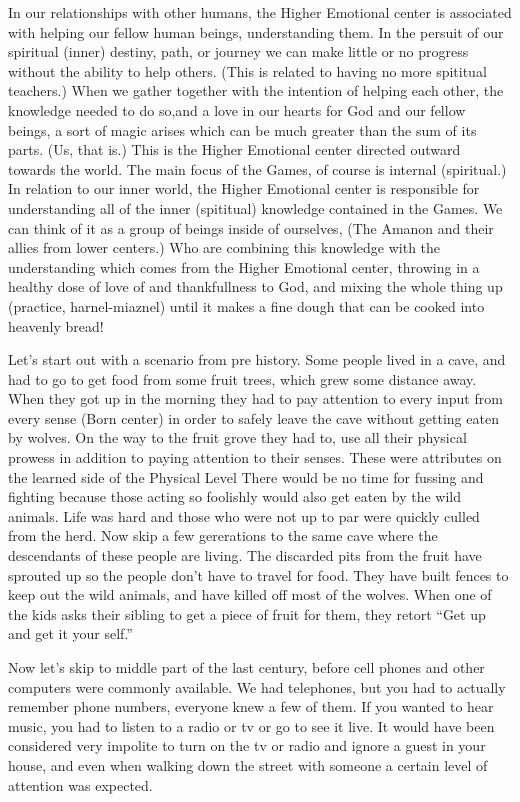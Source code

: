 \documentclass[12pt,letterpaper]{book}
\begin{document}
In our relationships with other humans, the Higher Emotional center is associated with helping our fellow human beings, understanding them. In the persuit of our spiritual (inner) destiny, path, or journey we can make little or no progress without the ability to help others. (This is related to having no more spititual teachers.) When we gather together with the intention of helping each other, the knowledge needed to do so,and a love in our hearts for God and our fellow beings, a sort of magic arises which can be much greater than the sum of its parts. (Us, that is.)  This is the Higher Emotional center directed outward towards the world. The main focus of the Games, of course is internal (spiritual.) In relation to our inner world, the Higher Emotional center is responsible for understanding all of the inner (spititual) knowledge contained in the Games. We can think of it as a group of beings inside of ourselves, (The Amanon and their allies from lower centers.) Who are combining this knowledge with the understanding which comes from the Higher Emotional center, throwing in a healthy dose of love of and thankfullness to God, and mixing the whole thing up (practice, harnel-miaznel) until it makes a fine dough that can be cooked into heavenly bread!

Let's start out with a scenario from pre history. Some people lived in a cave, and had to go to get food from some fruit trees, which grew some distance away. When they got up in the morning they had to pay attention to every input from every sense (Born center) in order to safely leave the cave without getting eaten by wolves. On the way to the fruit grove they had to, use all their physical prowess in addition to paying attention to their senses. These were attributes on the learned side of the Physical Level There would be no time for fussing and fighting because those acting so foolishly would also get eaten by the wild animals. Life was hard and those who were not up to par were quickly culled from the herd. Now skip a few gererations to the same cave where the descendants of these people are living. The discarded pits from the fruit have sprouted up so the people don't have to travel for food. They have built fences to keep out the wild animals, and have killed off most of the wolves. When one of the kids asks their sibling to get a piece of fruit for them, they retort ``Get up and get it your self.''

Now let's skip to middle part of the last century, before cell phones and other computers were commonly available. We had telephones, but you had to actually remember phone numbers, everyone knew a few of them. If you wanted to hear music, you had to listen to a radio or tv or go to see it live. It would have been considered very impolite to turn on the tv or radio and ignore a guest in your house, and even when walking down the street with someone a certain level of attention was expected.
\end{document}
